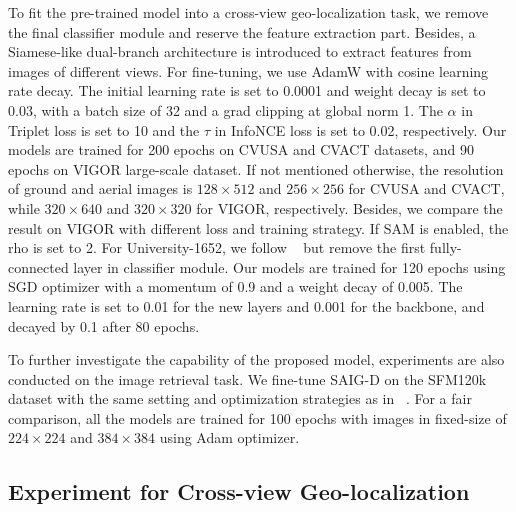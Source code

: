 \documentclass[sn-basic,iicol]{sn-jnl}
\theoremstyle{thmstyletwo}\newtheorem{example}{Example}\newtheorem{remark}{Remark}
\theoremstyle{thmstylethree}\newtheorem{definition}{Definition}
\begin{document}
 To fit the pre-trained model into a cross-view geo-localization task, we remove the final classifier module and reserve the feature extraction part. Besides, a Siamese-like dual-branch architecture is introduced to extract features from images of different views. For fine-tuning, we use AdamW with cosine learning rate decay. The initial learning rate is set to 0.0001 and weight decay is set to 0.03, with a batch size of 32 and a grad clipping at global norm 1. The $\alpha$ in Triplet loss is set to 10 and the $\tau$ in InfoNCE loss is set to 0.02, respectively. Our models are trained for 200 epochs on CVUSA and CVACT datasets, and 90 epochs on VIGOR large-scale dataset. If not mentioned otherwise, the resolution of ground and aerial images is $128\times512$ and $256\times256$ for CVUSA and CVACT, while $320\times640$ and $320\times320$ for VIGOR, respectively. Besides, we compare the result on VIGOR with different loss and training strategy. If SAM is enabled, the rho is set to 2. For University-1652, we follow ~\citep{wang2021LPN} but remove the first fully-connected layer in classifier module. Our models are trained for 120 epochs using SGD optimizer with a momentum of 0.9 and a weight decay of 0.005. The learning rate is set to 0.01 for the new layers and 0.001 for the backbone, and decayed by 0.1 after 80 epochs. 


 To further investigate the capability of the proposed model, experiments are also conducted on the image retrieval task. We fine-tune SAIG-D on the SFM120k dataset with the same setting and optimization strategies as in ~\citep{TrainViTforImageRetri}. For a fair comparison, all the models are trained for 100 epochs with images in fixed-size of $224\times224$ and $384\times384$ using Adam optimizer. 

\subsection{Experiment for Cross-view Geo-localization}
\end{document}
